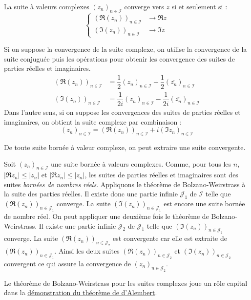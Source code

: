 \begin{prop}
 La suite à valeurs complexes $(z_n)_{n\in \mathcal I}$ converge vers $z$ si et seulement si :
\begin{displaymath}
 \left\lbrace 
\begin{aligned}
 (\Re(z_n))_{n\in \mathcal I} &\rightarrow \Re z \\
(\Im(z_n))_{n\in \mathcal I} &\rightarrow \Im z
\end{aligned}
\right. 
\end{displaymath}
\end{prop}
\begin{demo}
 Si on suppose la convergence de la suite complexe, on utilise la convergence de la suite conjuguée puis les opérations pour obtenir les convergence des suites de parties réelles et imaginaires. 
\begin{align*}
 (\Re(z_n))_{n\in \mathcal I} &= \dfrac{1}{2}(z_n)_{n\in \mathcal I} + \dfrac{1}{2}(\overline{z_n})_{n\in \mathcal I}\\
(\Im(z_n))_{n\in \mathcal I} &= \dfrac{1}{2i}(z_n)_{n\in \mathcal I} - \dfrac{1}{2i}(\overline{z_n})_{n\in \mathcal I}
\end{align*}
Dans l'autre sens, si on suppose les convergences des suites de parties réelles et imaginaires, on obtient la suite complexe par combinaison :
\begin{displaymath}
 (z_n)_{n\in \mathcal I} = (\Re(z_n))_{n\in \mathcal I} + i(\Im z_n)_{n\in \mathcal I}
\end{displaymath}
\end{demo}
\begin{thm}
 De toute suite bornée à valeur complexe, on peut extraire une suite convergente.
\end{thm}
\begin{demo}
 Soit $(z_n)_{n\in \mathcal I}$ une suite bornée à valeurs complexes. Comme, pour tous les $n$, $|\Re z_n |\leq |z_n|$ et $|\Re z_n |\leq |z_n|$, les suites de parties réelles et imaginaires sont des suites \emph{bornées de nombres réels}.\newline
Appliquons le théorème de Bolzano-Weirstrass à la suite des parties réelles. Il existe donc une partie infinie $\mathcal J_1$ de $\mathcal I$ telle que  $(\Re(z_n))_{n\in \mathcal J_1}$ converge.\newline
La suite $(\Im(z_n))_{n\in \mathcal J_1}$ est encore une suite bornée de nombre réel. On peut appliquer une deuxième fois le théorème de Bolzano-Weirstrass. Il existe une partie infinie $\mathcal J_2$ de $\mathcal J_1$ telle que  $(\Im(z_n))_{n\in \mathcal J_2}$ converge.\newline
La suite $(\Re(z_n))_{n\in \mathcal J_2}$ est convergente car elle est extraite de $(\Re(z_n))_{n\in \mathcal J_1}$. Ainsi les deux suites $(\Re(z_n))_{n\in \mathcal J_2}$ et $(\Im(z_n))_{n\in \mathcal J_2}$ convergent ce qui assure la convergence de $(z_n)_{n\in \mathcal J_2}$.
\end{demo}
Le théorème de Bolzano-Weirstrass pour les suites complexes joue un rôle capital dans la \href{\baseurl C5213.pdf}{démonstration du théorème de d'Alembert}. 

